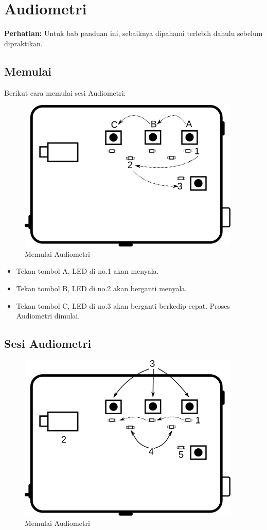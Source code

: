 \documentclass[12pt,]{article}
\begin{document}
	\newpage
	\section{Audiometri}
	
	\textbf{Perhatian:} Untuk bab panduan ini, sebaiknya dipahami terlebih dahulu sebelum dipraktikan.
	
	\subsection{Memulai}
	Berikut cara memulai sesi Audiometri:
	
	\begin{figure}[!ht]
		\centering
		\includegraphics[width=300pt]{images/Start}
		\caption{Memulai Audiometri}
	\end{figure}

	\begin{itemize}
		\item Tekan tombol A, LED di no.1 akan menyala.
		\item Tekan tombol B, LED di no.2 akan berganti menyala.
		\item Tekan tombol C, LED di no.3 akan berganti berkedip cepat.
		Proses Audiometri dimulai.
	\end{itemize}
	
	\newpage
	\subsection{Sesi Audiometri}
	
		\begin{figure}[!ht]
		\centering
		\includegraphics[width=300pt]{images/sesi}
		\caption{Memulai Audiometri}
	\end{figure}
	
\end{document}
